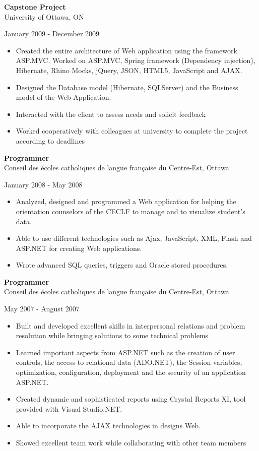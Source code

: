 \documentclass[]{friggeri-cv}
\begin{document}
\textbf{Capstone Project} \\ 
University of Ottawa, ON
\begin{flushright}  
January 2009 - December 2009 \\
\end{flushright}  
\begin{itemize}
\item Created the entire architecture of Web application using the framework ASP.MVC. Worked on ASP.MVC, Spring framework (Dependency injection), Hibernate, Rhino Mocks, jQuery, JSON, HTML5, JavaScript and AJAX.
\item Designed the Database model (Hibernate, SQLServer) and the Business model of the Web Application.
\item Interacted with the client to assess needs and solicit feedback
\item Worked cooperatively with colleagues at university to complete the project according to deadlines 
\end{itemize}

\textbf{Programmer} \\ 
Conseil des écoles catholiques de langue française du Centre-Est, Ottawa
\begin{flushright}  
January 2008 - May 2008 \\
\end{flushright}  

\begin{itemize}
\item Analyzed, designed and programmed a Web application for helping the orientation counselors of the CECLF to manage and to visualize student’s data.
\item Able to use different technologies such as Ajax, JavaScript, XML, Flash and ASP.NET for creating Web applications.
\item Wrote advanced SQL queries, triggers and Oracle stored procedures.
\end{itemize}

\textbf{Programmer} \\ 
Conseil des écoles catholiques de langue française du Centre-Est, Ottawa
\begin{flushright}  
May 2007 - August 2007 \\
\end{flushright}  
\begin{itemize}
\item Built and developed excellent skills in interpersonal relations and problem resolution while bringing solutions to some technical problems
\item Learned important aspects from ASP.NET such as the creation of user controls, the access to relational data (ADO.NET), the Session variables, optimization, configuration, deployment and the security of an application ASP.NET.
\item Created dynamic and sophisticated reports using Crystal Reports XI, tool provided with Visual Studio.NET.
\item Able to incorporate the AJAX technologies in designs Web.
\item Showed excellent team work while collaborating with other team members
\end{itemize}
\end{document}
